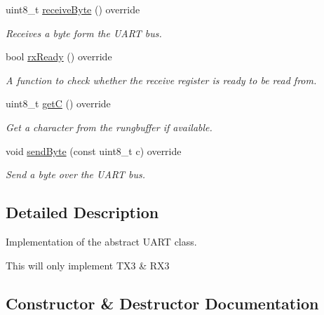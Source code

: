 \begin{DoxyCompactItemize}
uint8\+\_\+t \hyperlink{classhwuart_1_1HardwareUart_a2a7cc19a29ac50b51a400df07d015490}{receive\+Byte} () override
\begin{DoxyCompactList}\small\item\em Receives a byte form the U\+A\+RT bus. \end{DoxyCompactList}\item 
\mbox{\label{classhwuart_1_1HardwareUart_a8bf7cbf7c39e18ea366f1da5681eee48}} 
bool \hyperlink{classhwuart_1_1HardwareUart_a8bf7cbf7c39e18ea366f1da5681eee48}{rx\+Ready} () override
\begin{DoxyCompactList}\small\item\em A function to check whether the receive register is ready to be read from. \end{DoxyCompactList}\item 
\mbox{\label{classhwuart_1_1HardwareUart_a219e2c41279163f6bc9140c1611d9649}} 
uint8\+\_\+t \hyperlink{classhwuart_1_1HardwareUart_a219e2c41279163f6bc9140c1611d9649}{getC} () override
\begin{DoxyCompactList}\small\item\em Get a character from the rungbuffer if available. \end{DoxyCompactList}\item 
\mbox{\label{classhwuart_1_1HardwareUart_a75dc837ff190754864cd80a810f50999}} 
void \hyperlink{classhwuart_1_1HardwareUart_a75dc837ff190754864cd80a810f50999}{send\+Byte} (const uint8\+\_\+t c) override
\begin{DoxyCompactList}\small\item\em Send a byte over the U\+A\+RT bus. \end{DoxyCompactList}\end{DoxyCompactItemize}


\subsection{Detailed Description}
Implementation of the abstract U\+A\+RT class. 

This will only implement T\+X3 \& R\+X3 

\subsection{Constructor \& Destructor Documentation}
\mbox{\label{classhwuart_1_1HardwareUart_acb12d8b48f3b93a02bc8c8d2798628c0}} 
